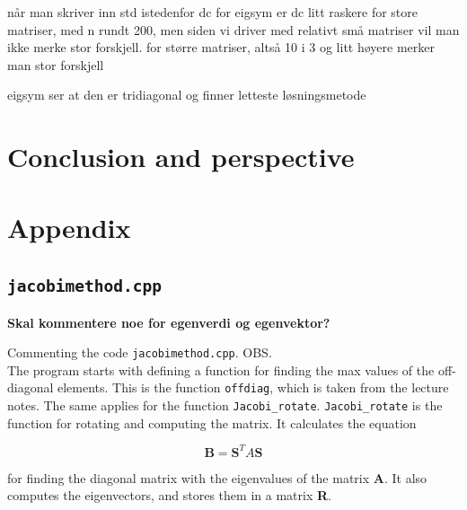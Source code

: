 \documentclass{article}
\begin{document}
    når man skriver inn std istedenfor dc for eigsym er dc litt raskere for store matriser, med n rundt 200, men siden vi driver med relativt små matriser vil man ikke merke stor forskjell. for større matriser, altså 10 i 3 og litt høyere merker man stor forskjell

    eigsym ser at den er tridiagonal og finner letteste løsningsmetode

\vspace{1cm}

\section{Conclusion and perspective} \label{sec:Conclusion}



\vspace{1cm}

\section{Appendix} \label{sec:Appendix}



\subsection{\texttt{jacobimethod.cpp}}

\textbf{Skal kommentere noe for egenverdi og egenvektor?}

Commenting the code \texttt{jacobimethod.cpp}.  OBS. \\

The program starts with defining a function for finding the max values of the off-diagonal elements. This is the function \texttt{offdiag}, which is taken from the lecture notes. The same applies for the function \texttt{Jacobi\_rotate}. \texttt{Jacobi\_rotate} is the function for rotating and computing the matrix. It calculates the equation

\begin{equation*}
    \textbf{B} = \textbf{S}^T A \textbf{S}
\end{equation*}

for finding the diagonal matrix with the eigenvalues of the matrix \textbf{A}. It also computes the eigenvectors, and stores them in a matrix \textbf{R}. \\
\end{document}
